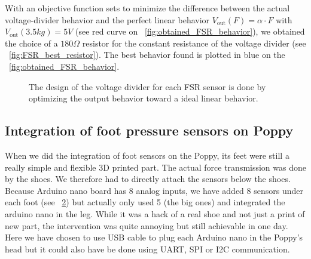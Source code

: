With an objective function sets to minimize the difference between the actual voltage-divider behavior and the perfect linear behavior $V_\mathrm{out}(F) = \alpha \cdot F$ with $V_\mathrm{out}(3.5kg) = 5V$ (see red curve on \figurename~\ref{fig:obtained_FSR_behavior}), we obtained the choice of a $180\Omega$ resistor for the constant resistance of the voltage divider (see \figurename~\ref{fig:FSR_best_resistor}). The best behavior found is plotted in blue on the \figurename~\ref{fig:obtained_FSR_behavior}.

\begin{figure}[h]
\centering
    \hfil
    \caption{The design of the voltage divider for each FSR sensor is done by optimizing the output behavior toward a ideal linear behavior.}
    \label{fig:foot_sensor_behavior}
\end{figure}



\subsection{Integration of foot pressure sensors on Poppy} %

When we did the integration of foot sensors on the Poppy, its feet were still a really simple and flexible 3D printed part. The actual force transmission was done by the shoes. We therefore had to directly attach the sensors below the shoes. Because Arduino nano board has 8 analog inputs, we have added 8 sensors under each foot (see \figurename~\ref{fig:poppy_foot_sensors}) but actually only used 5 (the big ones) and integrated the arduino nano in the leg. While it was a hack of a real shoe and not just a print of new part, the intervention was quite annoying but still achievable in one day. Here we have chosen to use USB cable to plug each Arduino nano in the Poppy's head but it could also have be done using UART, SPI or I2C communication.

\begin{figure}[h]
\centering
    \hfil
    \caption{}
    \label{fig:poppy_foot_sensors}
\end{figure}


